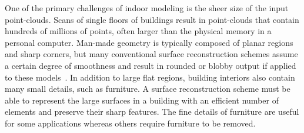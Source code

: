 \documentclass[10pt,twocolumn,twoside]{IEEEtran}
\begin{document}
One of the primary challenges of indoor modeling is the sheer size of the input point-clouds.  Scans of single floors of buildings result in point-clouds that contain hundreds of millions of points, often larger than the physical memory in a personal computer.  Man-made geometry is typically composed of planar regions and sharp corners, but many conventional surface reconstruction schemes assume a certain degree of smoothness and result in rounded or blobby output if applied to these models~\cite{Powercrust,OctreeSculpting,Carving,ProgressiveMesh,Poisson,Eigencrust}.  In addition to large flat regions, building interiors also contain many small details, such as furniture.  A surface reconstruction scheme must be able to represent the large surfaces in a building with an efficient number of elements and preserve their sharp features.  The fine details of furniture are useful for some applications whereas others require furniture to be removed.  
\end{document}
